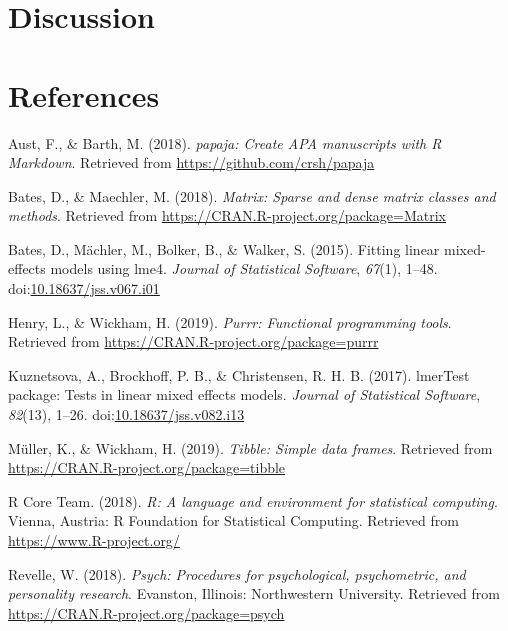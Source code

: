 \documentclass[man]{apa6}
\begin{document}
\hypertarget{discussion}{%
\section{Discussion}\label{discussion}}

\newpage

\hypertarget{references}{%
\section{References}\label{references}}

\begingroup
\setlength{\parindent}{-0.5in}
\setlength{\leftskip}{0.5in}

\hypertarget{refs}{}
\leavevmode\hypertarget{ref-R-papaja}{}%
Aust, F., \& Barth, M. (2018). \emph{papaja: Create APA manuscripts with R Markdown}. Retrieved from \url{https://github.com/crsh/papaja}

\leavevmode\hypertarget{ref-R-Matrix}{}%
Bates, D., \& Maechler, M. (2018). \emph{Matrix: Sparse and dense matrix classes and methods}. Retrieved from \url{https://CRAN.R-project.org/package=Matrix}

\leavevmode\hypertarget{ref-R-lme4}{}%
Bates, D., Mächler, M., Bolker, B., \& Walker, S. (2015). Fitting linear mixed-effects models using lme4. \emph{Journal of Statistical Software}, \emph{67}(1), 1--48. doi:\href{https://doi.org/10.18637/jss.v067.i01}{10.18637/jss.v067.i01}

\leavevmode\hypertarget{ref-R-purrr}{}%
Henry, L., \& Wickham, H. (2019). \emph{Purrr: Functional programming tools}. Retrieved from \url{https://CRAN.R-project.org/package=purrr}

\leavevmode\hypertarget{ref-R-lmerTest}{}%
Kuznetsova, A., Brockhoff, P. B., \& Christensen, R. H. B. (2017). lmerTest package: Tests in linear mixed effects models. \emph{Journal of Statistical Software}, \emph{82}(13), 1--26. doi:\href{https://doi.org/10.18637/jss.v082.i13}{10.18637/jss.v082.i13}

\leavevmode\hypertarget{ref-R-tibble}{}%
Müller, K., \& Wickham, H. (2019). \emph{Tibble: Simple data frames}. Retrieved from \url{https://CRAN.R-project.org/package=tibble}

\leavevmode\hypertarget{ref-R-base}{}%
R Core Team. (2018). \emph{R: A language and environment for statistical computing}. Vienna, Austria: R Foundation for Statistical Computing. Retrieved from \url{https://www.R-project.org/}

\leavevmode\hypertarget{ref-R-psych}{}%
Revelle, W. (2018). \emph{Psych: Procedures for psychological, psychometric, and personality research}. Evanston, Illinois: Northwestern University. Retrieved from \url{https://CRAN.R-project.org/package=psych}
\end{document}

